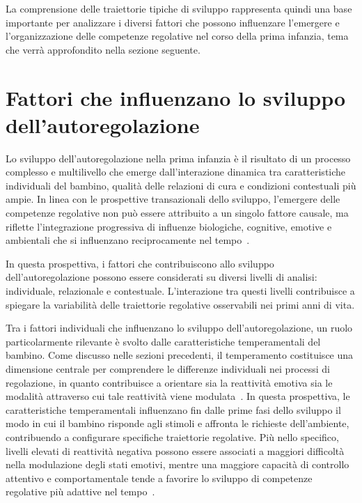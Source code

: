             La comprensione delle traiettorie tipiche di sviluppo rappresenta quindi una base importante per analizzare i diversi fattori che possono influenzare l'emergere e l'organizzazione delle competenze regolative nel corso della prima infanzia, tema che verrà approfondito nella sezione seguente.

    \section{Fattori che influenzano lo sviluppo dell'autoregolazione}
    \label{sec:1_7}

        Lo sviluppo dell'autoregolazione nella prima infanzia è il risultato di un processo complesso e multilivello che emerge dall'interazione dinamica tra caratteristiche individuali del bambino, qualità delle relazioni di cura e condizioni contestuali più ampie. In linea con le prospettive transazionali dello sviluppo, l'emergere delle competenze regolative non può essere attribuito a un singolo fattore causale, ma riflette l'integrazione progressiva di influenze biologiche, cognitive, emotive e ambientali che si influenzano reciprocamente nel tempo~\cite{sameroff2009}.

        In questa prospettiva, i fattori che contribuiscono allo sviluppo dell'autoregolazione possono essere considerati su diversi livelli di analisi: individuale, relazionale e contestuale. L'interazione tra questi livelli contribuisce a spiegare la variabilità delle traiettorie regolative osservabili nei primi anni di vita.

        Tra i fattori individuali che influenzano lo sviluppo dell'autoregolazione, un ruolo particolarmente rilevante è svolto dalle caratteristiche temperamentali del bambino. Come discusso nelle sezioni precedenti, il temperamento costituisce una dimensione centrale per comprendere le differenze individuali nei processi di regolazione, in quanto contribuisce a orientare sia la reattività emotiva sia le modalità attraverso cui tale reattività viene modulata~\cite{rothbart2006}. In questa prospettiva, le caratteristiche temperamentali influenzano fin dalle prime fasi dello sviluppo il modo in cui il bambino risponde agli stimoli e affronta le richieste dell'ambiente, contribuendo a configurare specifiche traiettorie regolative. Più nello specifico, livelli elevati di reattività negativa possono essere associati a maggiori difficoltà nella modulazione degli stati emotivi, mentre una maggiore capacità di controllo attentivo e comportamentale tende a favorire lo sviluppo di competenze regolative più adattive nel tempo~\cite{kochanska2000}.

